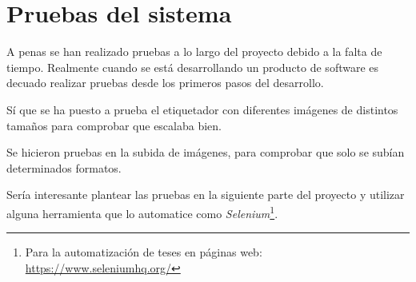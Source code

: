 \section{Pruebas del sistema}
A penas se han realizado pruebas a lo largo del proyecto debido a la falta de tiempo. Realmente cuando se está desarrollando un producto de software es decuado realizar pruebas desde los primeros pasos del desarrollo.

Sí que se ha puesto a prueba el etiquetador con diferentes imágenes de distintos tamaños para comprobar que escalaba bien.

Se hicieron pruebas en la subida de imágenes, para comprobar que solo se subían determinados formatos.

Sería interesante plantear las pruebas en la siguiente parte del proyecto y utilizar alguna herramienta que lo automatice como \textit{Selenium}\footnote{Para la automatización de teses en páginas web: \url{https://www.seleniumhq.org/}}.